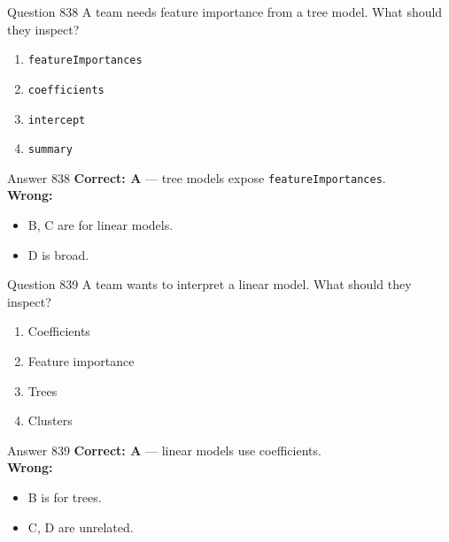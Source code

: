 \documentclass[aspectratio=169,11pt]{beamer}
\begin{document}
	\begin{frame}{Question 838}
		A team needs feature importance from a tree model. What should they inspect?
		\begin{enumerate}[label=\Alph*.]
			\item \texttt{featureImportances}
			\item \texttt{coefficients}
			\item \texttt{intercept}
			\item \texttt{summary}
		\end{enumerate}
	\end{frame}
	\begin{frame}{Answer 838}
		\textbf{Correct: A} --- tree models expose \texttt{featureImportances}.\\
		\vspace{0.5em}
		\textbf{Wrong:}
		\begin{itemize}
			\item B, C are for linear models.
			\item D is broad.
		\end{itemize}
	\end{frame}
	
	\begin{frame}{Question 839}
		A team wants to interpret a linear model. What should they inspect?
		\begin{enumerate}[label=\Alph*.]
			\item Coefficients
			\item Feature importance
			\item Trees
			\item Clusters
		\end{enumerate}
	\end{frame}
	\begin{frame}{Answer 839}
		\textbf{Correct: A} --- linear models use coefficients.\\
		\vspace{0.5em}
		\textbf{Wrong:}
		\begin{itemize}
			\item B is for trees.
			\item C, D are unrelated.
		\end{itemize}
	\end{frame}
	
\end{document}
